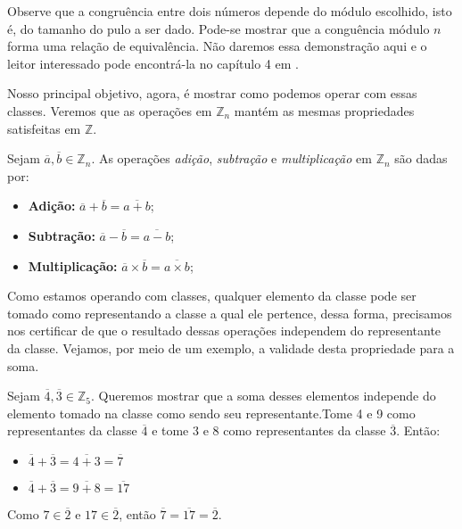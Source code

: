 Observe que a congru\^{e}ncia entre dois n\'{u}meros depende do m\'{o}dulo escolhido, isto \'{e}, do tamanho 
do pulo a ser dado. Pode-se mostrar que a congu\^{e}ncia m\'{o}dulo $n$ forma uma rela\c{c}\~{a}o de 
equival\^{e}ncia. N\~{a}o daremos essa demonstra\c{c}\~{a}o aqui e o leitor interessado pode encontr\'{a}-la no 
cap\'{i}tulo 4 em \cite{cou:2014}.

Nosso principal objetivo, agora, \'{e} mostrar como podemos operar com essas classes. Veremos que as 
opera\c{c}\~{o}es em $\mathbb{Z}_{n}$ mant\'{e}m as mesmas propriedades satisfeitas em $\mathbb{Z}$.

\begin{Df}
Sejam $\overline{a},\overline{b}\in\mathbb{Z}_{n}$. As opera\c{c}\~{o}es \textit{adi\c{c}\~{a}o}, 
\textit{subtra\c{c}\~{a}o} e \textit{multiplica\c{c}\~{a}o} em $\mathbb{Z}_{n}$ s\~{a}o dadas por:
	\begin{itemize}
			\item \textbf{Adi\c{c}\~{a}o:} $\overline{a}+\overline{b}=\overline{a+b}$;
			\item \textbf{Subtra\c{c}\~{a}o:} $\overline{a}-\overline{b}=\overline{a-b}$;
			\item \textbf{Multiplica\c{c}\~{a}o:} $\overline{a}\times\overline{b}=\overline{a\times b}$;
	\end{itemize}
\end{Df}

Como estamos operando com classes, qualquer elemento da classe pode ser tomado como representando 
a classe a qual ele pertence, dessa forma, precisamos nos certificar de que o resultado dessas opera\c{c}\~{o}es 
independem do representante da classe. Vejamos, por meio de um exemplo, a validade desta propriedade para a soma.

Sejam $\overline{4},\overline{3}\in\mathbb{Z}_{5}$. Queremos mostrar que a soma desses elementos independe do 
elemento tomado na classe como sendo seu representante.Tome 4 e 9 como representantes da classe $\overline{4}$ e
tome 3 e 8 como representantes da classe $\overline{3}$. Ent\~{a}o:
				\begin{itemize}
					\item $\overline{4}+\overline{3}=\overline{4+3}=\overline{7}$
					\item $\overline{4}+\overline{3}=\overline{9+8}=\overline{17}$ 
				\end{itemize}
Como $7\in\overline{2}$ e $17\in\overline{2}$, ent\~{a}o $\overline{7}=\overline{17}=\overline{2}$.

